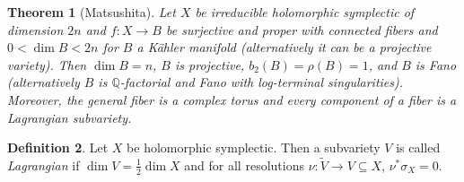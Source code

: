 \documentclass[leqno, openany]{memoir}
\newtheorem{thm}{Theorem}[section]
\theoremstyle{definition}
\newtheorem{defn}[thm]{Definition}
\theoremstyle{remark}
\theoremstyle{plain}
\theoremstyle{definition}
\theoremstyle{remark}
\newcommand{\Q}{\mathbb{Q}}
\newcommand{\wt}[1]{\widetilde{#1}}
\begin{document}
\begin{thm}[Matsushita]
    Let $X$ be irreducible holomorphic symplectic of dimension $2n$ and $f \colon X \to B$ be surjective and proper with connected fibers and $0 < \dim B < 2n$ for $B$ a K\"ahler manifold (alternatively it can be a projective variety). Then $\dim B = n$, $B$ is projective, $b_2(B) = \rho(B) = 1$, and $B$ is Fano (alternatively $B$ is $\Q$-factorial and Fano with log-terminal singularities). Moreover, the general fiber is a complex torus and every component of a fiber is a Lagrangian subvariety.
\end{thm}

\begin{defn}
    Let $X$ be holomorphic symplectic. Then a subvariety $V$ is called \textit{Lagrangian} if $\dim V = \frac{1}{2} \dim X$ and for all resolutions $\nu \colon \wt{V} \to V \subseteq X$, $\nu^* \sigma_X = 0$.
\end{defn}
\end{document}
